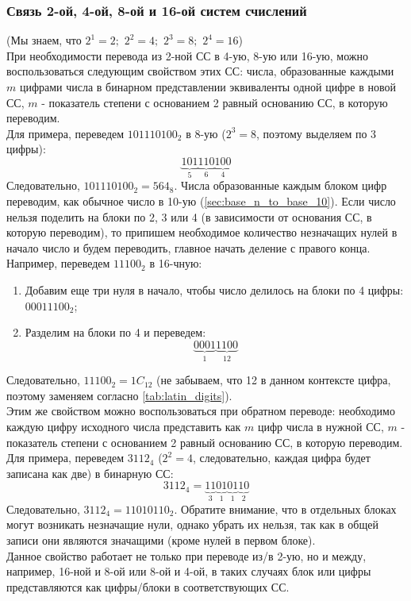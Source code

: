 \documentclass[12pt]{article}
\theoremstyle{problem_style}
\begin{document}
\subsubsection{Связь 2-ой, 4-ой, 8-ой и 16-ой систем счислений}
(Мы знаем, что $2^1=2;\,\, 2^2=4;\,\, 2^3=8;\,\, 2^4=16$)\\
При необходимости перевода из 2-ной СС в 4-ую, 8-ую или 16-ую, можно воспользоваться следующим свойством этих СС: числа, образованные каждыми $m$ цифрами числа в бинарном представлении эквиваленты одной цифре в новой СС, $m$ - показатель степени с основанием 2 равный основанию СС, в которую переводим.\\
Для примера, переведем $101110100_2$ в 8-ую ($2^3 = 8$, поэтому выделяем по 3 цифры):
\[
  \underbrace{101}_5
  \!
  \underbrace{110}_6
  \!
  \underbrace{100}_4
\]
Следовательно, $101110100_2 = 564_8$. Числа образованные каждым блоком цифр переводим, как обычное число в 10-ую (\autoref{sec:base_n_to_base_10}). Если число нельзя поделить на блоки по 2, 3 или 4 (в зависимости от основания СС, в которую переводим), то припишем необходимое количество незначащих нулей в начало число и будем переводить, главное начать деление с правого конца. Например, переведем $11100_2$ в 16-чную:
\begin{enumerate}
    \item Добавим еще три нуля в начало, чтобы число делилось на блоки по 4 цифры: $00011100_2$;
    \item Разделим на блоки по 4 и переведем:
    \[
    \underbrace{0001}_1
    \!
    \underbrace{1100}_{12}
    \]
\end{enumerate}
Следовательно, $11100_2 = 1C_{12}$ (не забываем, что 12 в данном контексте цифра, поэтому заменяем согласно \autoref{tab:latin_digits}).\\
Этим же свойством можно воспользоваться при обратном переводе: необходимо каждую цифру исходного числа представить как $m$ цифр числа в нужной СС, $m$ - показатель степени с основанием 2 равный основанию СС, в которую переводим.  Для примера, переведем $3112_4$ ($2^2=4$, следовательно, каждая цифра будет записана как две) в бинарную СС:
\[3112_4 = \underbrace{11}_3 \! \underbrace{01}_1 \! \underbrace{01}_1 \! \underbrace{10}_2\]
Следовательно, $3112_4 = 11010110_2$. Обратите внимание, что в отдельных блоках могут возникать незначащие нули, однако убрать их нельзя, так как в общей записи они являются значащими (кроме нулей в первом блоке).\\
Данное свойство работает не только при переводе из/в 2-ую, но и между, например, 16-ной и 8-ой или 8-ой и 4-ой, в таких случаях блок или цифры представляются как цифры/блоки в соответствующих СС.
\end{document}
